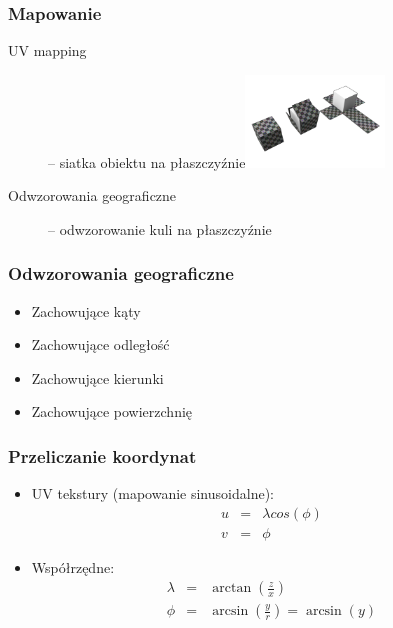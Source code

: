 \documentclass{beamer}
\begin{document}
\frame
{
	\frametitle{Mapowanie}

	\begin{description}
	\item[UV mapping] -- siatka obiektu na płaszczyźnie\includegraphics[width=0.30\textwidth]{img/uv_wrapping.png}
	\pause
	\item[Odwzorowania geograficzne] -- odwzorowanie kuli na płaszczyźnie
	\end{description}
}

\frame
{
	\frametitle{Odwzorowania geograficzne}

	\begin{itemize}
	\item Zachowujące kąty
	\item Zachowujące odległość
	\item Zachowujące kierunki
	\item Zachowujące powierzchnię
	\end{itemize}

	\pause

	\begin{figure}
	\centering
	 \hspace{.0\textwidth}
	\pause
	\label{fig:normmap}
	\end{figure}
	\setcounter{subfigure}{0}
}

\frame
{
	\frametitle{Przeliczanie koordynat}

	\begin{itemize}
	\item UV tekstury (mapowanie sinusoidalne):
		\begin{eqnarray*}
		u &=& \lambda cos(\phi) \\
		v &=& \phi
		\end{eqnarray*}
	\pause
	\item Współrzędne:
		\begin{eqnarray*}
		\lambda &=& \arctan(\frac{z}{x}) \\
		\phi &=& \arcsin(\frac{y}{r}) = \arcsin(y) 
		\end{eqnarray*}
	\end{itemize}
}
\end{document}
